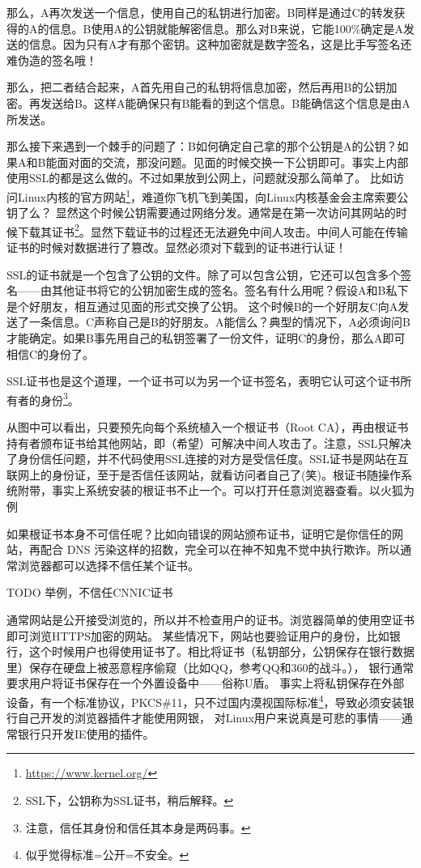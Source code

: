 那么，A再次发送一个信息，使用自己的私钥进行加密。B同样是通过C的转发获得的A的信息。B使用A的公钥就能解密信息。那么对B来说，它能100\%确定是A发送的信息。因为只有A才有那个密钥。这种加密就是数字签名，这是比手写签名还难伪造的签名哦！

那么，把二者结合起来，A首先用自己的私钥将信息加密，然后再用B的公钥加密。再发送给B。这样A能确保只有B能看的到这个信息。B能确信这个信息是由A所发送。

那么接下来遇到一个棘手的问题了：B如何确定自己拿的那个公钥是A的公钥？如果A和B能面对面的交流，那没问题。见面的时候交换一下公钥即可。事实上内部使用SSL的都是这么做的。不过如果放到公网上，问题就没那么简单了。
比如访问Linux内核的官方网站\footnote{\url{https://www.kernel.org/} }，难道你飞机飞到美国，向Linux内核基金会主席索要公钥了么？
显然这个时候公钥需要通过网络分发。通常是在第一次访问其网站的时候下载其证书\footnote{SSL下，公钥称为SSL证书，稍后解释。}。显然下载证书的过程还无法避免中间人攻击。中间人可能在传输证书的时候对数据进行了篡改。显然必须对下载到的证书进行认证！

SSL的证书就是一个包含了公钥的文件。除了可以包含公钥，它还可以包含多个签名——由其他证书将它的公钥加密生成的签名。签名有什么用呢？假设A和B私下是个好朋友，相互通过见面的形式交换了公钥。
这个时候B的一个好朋友C向A发送了一条信息。C声称自己是B的好朋友。A能信么？典型的情况下，A必须询问B才能确定。如果B事先用自己的私钥签署了一份文件，证明C的身份，那么A即可相信C的身份了。

SSL证书也是这个道理，一个证书可以为另一个证书签名，表明它认可这个证书所有者的身份\footnote{注意，信任其身份和信任其本身是两码事。}。 


从图中可以看出，只要预先向每个系统植入一个根证书（Root CA），再由根证书持有者颁布证书给其他网站，即（希望）可解决中间人攻击了。注意，SSL只解决了身份信任问题，并不代码使用SSL连接的对方是受信任度。SSL证书是网站在互联网上的身份证，至于是否信任该网站，就看访问者自己了(笑)。根证书随操作系统附带，事实上系统安装的根证书不止一个。可以打开任意浏览器查看。以火狐为例


如果根证书本身不可信任呢？比如向错误的网站颁布证书，证明它是你信任的网站，再配合 DNS 污染这样的招数，完全可以在神不知鬼不觉中执行欺诈。所以通常浏览器都可以选择不信任某个证书。

TODO 举例，不信任CNNIC证书

通常网站是公开接受浏览的，所以并不检查用户的证书。浏览器简单的使用空证书即可浏览HTTPS加密的网站。
某些情况下，网站也要验证用户的身份，比如银行，这个时候用户也得使用证书了。相比将证书（私钥部分，公钥保存在银行数据里）保存在硬盘上被恶意程序偷窥（比如QQ，参考QQ和360的战斗。），
银行通常要求用户将证书保存在一个外置设备中——俗称U盾。
事实上将私钥保存在外部设备，有一个标准协议，PKCS\#11，只不过国内漠视国际标准\footnote{似乎觉得标准=公开=不安全。}，导致必须安装银行自己开发的浏览器插件才能使用网银，
对Linux用户来说真是可悲的事情——通常银行只开发IE使用的插件。



